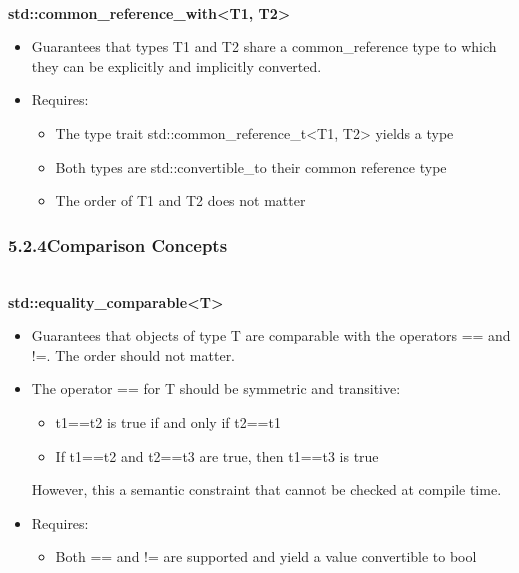 \noindent
\hspace*{\fill} \\ %
\textbf{std::common\_reference\_with<T1, T2>}

\begin{itemize}
\item
Guarantees that types T1 and T2 share a common\_reference type to which they can be explicitly and implicitly converted.

\item
Requires:
\begin{itemize}
\item
The type trait std::common\_reference\_t<T1, T2> yields a type

\item
Both types are std::convertible\_to their common reference type

\item
The order of T1 and T2 does not matter
\end{itemize}
\end{itemize}

\subsubsection*{ 5.2.4\hspace{0.2cm}Comparison Concepts}

\noindent
\hspace*{\fill} \\ %
\textbf{std::equality\_comparable<T>}

\begin{itemize}
\item
Guarantees that objects of type T are comparable with the operators == and !=. The order should not matter.

\item
The operator == for T should be symmetric and transitive:
\begin{itemize}
\item
t1==t2 is true if and only if t2==t1

\item
If t1==t2 and t2==t3 are true, then t1==t3 is true
\end{itemize}

However, this a semantic constraint that cannot be checked at compile time.

\item
Requires:
\begin{itemize}
\item
Both == and != are supported and yield a value convertible to bool
\end{itemize}
\end{itemize}


